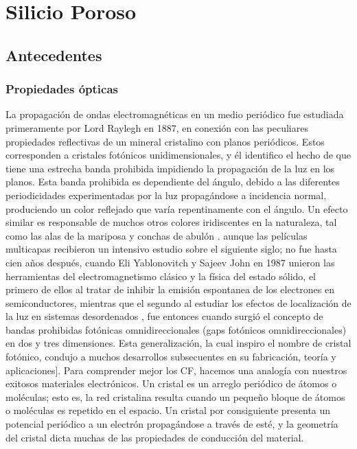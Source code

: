 \documentclass[a4paper,11pt,]{book}
\begin{document}
\chapter{Silicio Poroso}
\label{Mo:continuo}
\section{Antecedentes}
\subsection{Propiedades ópticas}


La propagación de ondas electromagnéticas en un medio periódico fue estudiada primeramente por Lord Raylegh en 1887, en conexión con las peculiares propiedades reflectivas de un mineral cristalino con planos periódicos. Estos corresponden a cristales fotónicos unidimensionales, y él identifico el hecho de que tiene una estrecha banda prohibida impidiendo la propagación de la luz en los planos.  Esta banda prohibida es dependiente del ángulo, debido a las diferentes periodicidades experimentadas por la luz propagándose a  incidencia normal, produciendo un color reflejado que varía repentinamente con el ángulo. Un efecto similar es responsable de muchos otros colores iridiscentes en la naturaleza, tal como las alas de la mariposa y conchas de abulón . aunque las películas multicapas recibieron un intensivo estudio sobre el siguiente siglo; no fue hasta cien  años después,  cuando Eli Yablonovitch y Sajeev John en 1987 unieron las herramientas del electromagnetismo clásico y la física del estado sólido, el primero de ellos al tratar de inhibir la emisión espontanea de los electrones en semiconductores, mientras que el segundo al estudiar los efectos de localización de la luz en sistemas desordenados , fue entonces cuando surgió el concepto de bandas prohibidas fotónicas omnidireccionales (gaps fotónicos omnidireccionales) en dos y tres dimensiones. Esta generalización, la cual inspiro el nombre de cristal fotónico, condujo a muchos desarrollos subsecuentes en su fabricación, teoría y aplicaciones].
Para comprender mejor los CF, hacemos una analogía con nuestros exitosos materiales electrónicos. Un cristal es un arreglo periódico de átomos o moléculas; esto es, la red cristalina resulta cuando un pequeño bloque de átomos o moléculas es repetido en el espacio. Un cristal por consiguiente presenta un potencial periódico a un electrón propagándose a través de esté, y la geometría del cristal  dicta muchas de las propiedades de conducción del material.
\end{document}
